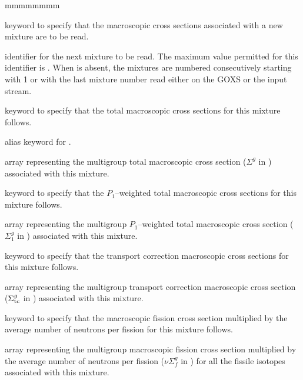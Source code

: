 \begin{ListeDeDescription}{mmmmmmmm}

\item[\moc{MIX}] keyword to specify that the macroscopic cross sections
associated with a new mixture are to be read.

\item[\dusa{matnum}] identifier for the next mixture to be read. The maximum
value permitted for this identifier is . When  is
absent, the mixtures are numbered consecutively starting with 1 or with the last
mixture number read either on the GOXS or the input stream.  

\item[\moc{NTOT0}] keyword to specify that the total macroscopic cross
sections for this mixture follows.

\item[\moc{TOTAL}] alias keyword for .

\item[\dusa{xssigt}] array representing the multigroup total macroscopic cross
section ($\Sigma^{g}$ in \xsunit) associated with this mixture.

\item[\moc{NTOT1}] keyword to specify that the $P_1$--weighted total macroscopic cross
sections for this mixture follows.

\item[\dusa{xssig1}] array representing the multigroup $P_1$--weighted total macroscopic cross
section ($\Sigma_1^{g}$ in \xsunit) associated with this mixture.

\item[\moc{TRANC}] keyword to specify that the transport correction macroscopic cross
sections for this mixture follows.

\item[\dusa{xsstra}] array representing the multigroup transport correction macroscopic cross
section ($\Sigma_{\rm tc}^{g}$ in \xsunit) associated with this mixture.

\item[\moc{NUSIGF}] keyword to specify that the macroscopic fission cross
section multiplied by the average number of neutrons per fission for this
mixture follows.

\item[\dusa{xssigf}] array representing the multigroup macroscopic fission
cross section multiplied by the average number
of neutrons per fission ($\nu\Sigma_{f}^{g}$ in \xsunit) for all the fissile
isotopes associated with this mixture. 


\end{ListeDeDescription}
